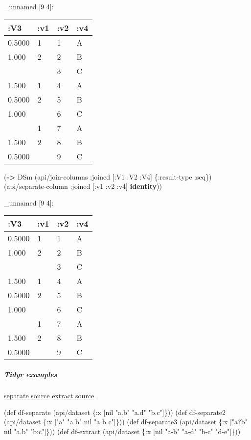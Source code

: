 \documentclass[]{article}
\newenvironment{Shaded}{\begin{snugshade}}{\end{snugshade}}
\newcommand{\KeywordTok}[1]{\textcolor[rgb]{0.13,0.29,0.53}{\textbf{#1}}}
\newcommand{\StringTok}[1]{\textcolor[rgb]{0.31,0.60,0.02}{#1}}
\newcommand{\FunctionTok}[1]{\textcolor[rgb]{0.00,0.00,0.00}{#1}}
\newcommand{\VariableTok}[1]{\textcolor[rgb]{0.00,0.00,0.00}{#1}}
\newcommand{\BuiltInTok}[1]{#1}
\newcommand{\AttributeTok}[1]{\textcolor[rgb]{0.77,0.63,0.00}{#1}}
\newcommand{\NormalTok}[1]{#1}
\let\oldsubparagraph\subparagraph
\renewcommand{\subparagraph}[1]{\oldsubparagraph{#1}\mbox{}}
\begin{document}
\_unnamed {[}9 4{]}:

\begin{longtable}[]{@{}llll@{}}
\toprule
:V3 & :v1 & :v2 & :v4\tabularnewline
\midrule
\endhead
0.5000 & 1 & 1 & A\tabularnewline
1.000 & 2 & 2 & B\tabularnewline
& & 3 & C\tabularnewline
1.500 & 1 & 4 & A\tabularnewline
0.5000 & 2 & 5 & B\tabularnewline
1.000 & & 6 & C\tabularnewline
& 1 & 7 & A\tabularnewline
1.500 & 2 & 8 & B\tabularnewline
0.5000 & & 9 & C\tabularnewline
\bottomrule
\end{longtable}

\begin{Shaded}
\begin{Highlighting}[]
\NormalTok{(}\KeywordTok{->}\NormalTok{ DSm}
\NormalTok{    (api/join-columns }\AttributeTok{:joined}\NormalTok{ [}\AttributeTok{:V1} \AttributeTok{:V2} \AttributeTok{:V4}\NormalTok{] \{}\AttributeTok{:result-type} \AttributeTok{:seq}\NormalTok{\})}
\NormalTok{    (api/separate-column }\AttributeTok{:joined}\NormalTok{ [}\AttributeTok{:v1} \AttributeTok{:v2} \AttributeTok{:v4}\NormalTok{] }\KeywordTok{identity}\NormalTok{))}
\end{Highlighting}
\end{Shaded}

\_unnamed {[}9 4{]}:

\begin{longtable}[]{@{}llll@{}}
\toprule
:V3 & :v1 & :v2 & :v4\tabularnewline
\midrule
\endhead
0.5000 & 1 & 1 & A\tabularnewline
1.000 & 2 & 2 & B\tabularnewline
& & 3 & C\tabularnewline
1.500 & 1 & 4 & A\tabularnewline
0.5000 & 2 & 5 & B\tabularnewline
1.000 & & 6 & C\tabularnewline
& 1 & 7 & A\tabularnewline
1.500 & 2 & 8 & B\tabularnewline
0.5000 & & 9 & C\tabularnewline
\bottomrule
\end{longtable}

\subparagraph{Tidyr examples}\label{tidyr-examples-1}

\href{https://tidyr.tidyverse.org/reference/separate.html}{separate
source}
\href{https://tidyr.tidyverse.org/reference/extract.html}{extract
source}

\begin{Shaded}
\begin{Highlighting}[]
\NormalTok{(}\BuiltInTok{def}\FunctionTok{ df-separate }\NormalTok{(api/dataset \{}\AttributeTok{:x}\NormalTok{ [}\VariableTok{nil} \StringTok{"a.b"} \StringTok{"a.d"} \StringTok{"b.c"}\NormalTok{]\}))}
\NormalTok{(}\BuiltInTok{def}\FunctionTok{ df-separate2 }\NormalTok{(api/dataset \{}\AttributeTok{:x}\NormalTok{ [}\StringTok{"a"} \StringTok{"a b"} \VariableTok{nil} \StringTok{"a b c"}\NormalTok{]\}))}
\NormalTok{(}\BuiltInTok{def}\FunctionTok{ df-separate3 }\NormalTok{(api/dataset \{}\AttributeTok{:x}\NormalTok{ [}\StringTok{"a?b"} \VariableTok{nil} \StringTok{"a.b"} \StringTok{"b:c"}\NormalTok{]\}))}
\NormalTok{(}\BuiltInTok{def}\FunctionTok{ df-extract }\NormalTok{(api/dataset \{}\AttributeTok{:x}\NormalTok{ [}\VariableTok{nil} \StringTok{"a-b"} \StringTok{"a-d"} \StringTok{"b-c"} \StringTok{"d-e"}\NormalTok{]\}))}
\end{Highlighting}
\end{Shaded}
\end{document}

